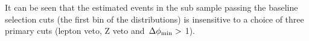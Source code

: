 It can be seen that the estimated \wjets events in the sub sample passing the baseline selection cuts (the first bin of the distributions) is insensitive to a choice of three primary cuts 
(lepton veto, Z veto and $\,{\Delta\phi_{\rm min}}>$ 1).
